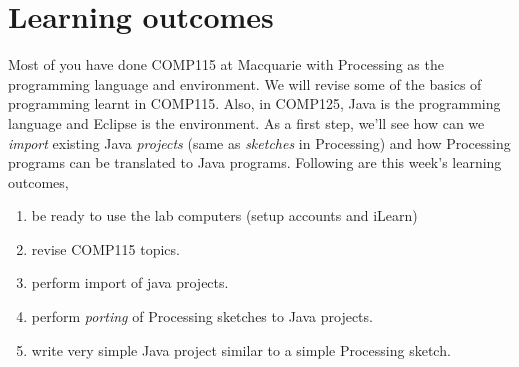 \renewcommand{\labelenumi}{\alph{enumi}.}

\large
 
\section*{Learning outcomes}
Most of you have done COMP115 at Macquarie with Processing as the programming language and environment. We will revise some of the basics of programming learnt in COMP115. Also, in COMP125, Java is the programming language and Eclipse is the environment. As a first step, we'll see how can we \emph{import} existing Java \emph{projects} (same as \emph{sketches} in Processing) and how Processing programs can be translated to Java programs. Following are this week's learning outcomes,
\begin{enumerate}
\item be ready to use the lab computers (setup accounts and iLearn)
\item revise COMP115 topics.
\item perform import of java projects.
\item perform \emph{porting} of Processing sketches to Java projects.
\item write very simple Java project similar to a simple Processing sketch.
\end{enumerate}

